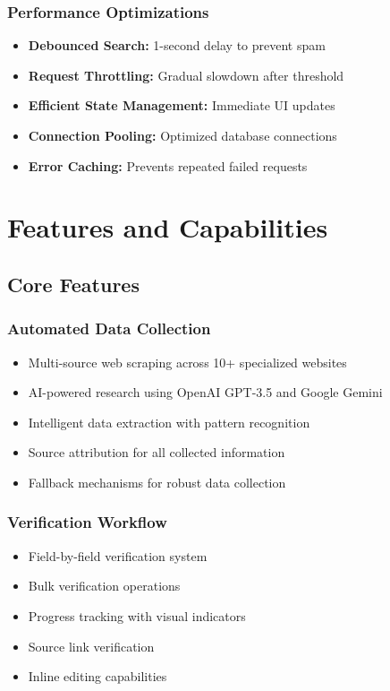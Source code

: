 \documentclass[12pt,a4paper]{article}
\begin{document}
\subsubsection{Performance Optimizations}

\begin{itemize}
    \item \textbf{Debounced Search:} 1-second delay to prevent spam
    \item \textbf{Request Throttling:} Gradual slowdown after threshold
    \item \textbf{Efficient State Management:} Immediate UI updates
    \item \textbf{Connection Pooling:} Optimized database connections
    \item \textbf{Error Caching:} Prevents repeated failed requests
\end{itemize}

\section{Features and Capabilities}

\subsection{Core Features}

\subsubsection{Automated Data Collection}
\begin{itemize}
    \item Multi-source web scraping across 10+ specialized websites
    \item AI-powered research using OpenAI GPT-3.5 and Google Gemini
    \item Intelligent data extraction with pattern recognition
    \item Source attribution for all collected information
    \item Fallback mechanisms for robust data collection
\end{itemize}

\subsubsection{Verification Workflow}
\begin{itemize}
    \item Field-by-field verification system
    \item Bulk verification operations
    \item Progress tracking with visual indicators
    \item Source link verification
    \item Inline editing capabilities
\end{itemize}
\end{document}
